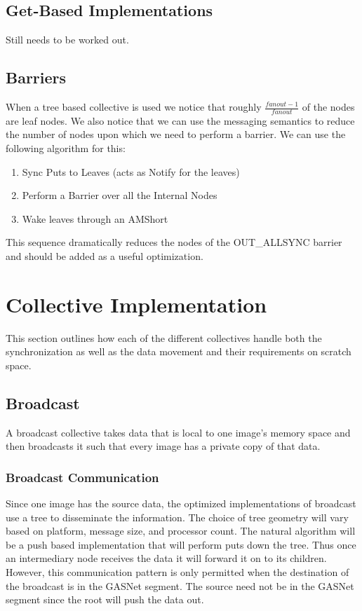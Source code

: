 \documentclass[times,10pt]{article}
\begin{document}
\subsection {Get-Based Implementations}
Still needs to be worked out.

\subsection {Barriers}
When a tree based collective is used we notice that roughly $\frac{fanout-1}{fanout}$ of the nodes are leaf nodes. We also notice that we can use the messaging semantics to reduce the number of nodes upon which we need to perform a barrier. We can use the following algorithm for this:

\begin{enumerate}
\item Sync Puts to Leaves (acts as Notify for the leaves)
\item Perform a Barrier over all the Internal Nodes
\item Wake leaves through an AMShort
\end{enumerate}

This sequence dramatically reduces the nodes of the OUT\_ALLSYNC barrier and should be added as a useful optimization. 

\section{Collective Implementation}
This section outlines how each of the different collectives handle both the synchronization as well as the
 data movement and their requirements on scratch space.

\subsection{Broadcast} 

A broadcast collective  takes data that is local  to one image's memory space and then broadcasts it 
such that every image has a private copy of that data. 

\subsubsection{Broadcast Communication}
Since one image has the source data, the optimized implementations of broadcast use a tree to 
disseminate the information. The choice of tree geometry will vary based on platform, message size, and 
processor count. The natural algorithm will be a push based implementation that will perform puts down the tree. Thus once an intermediary node receives the data it will forward it on to its children. However, this communication pattern is only permitted when the destination of the broadcast is in the GASNet segment. The source need not be in the GASNet segment since the root will push the data out. 
\end{document}
